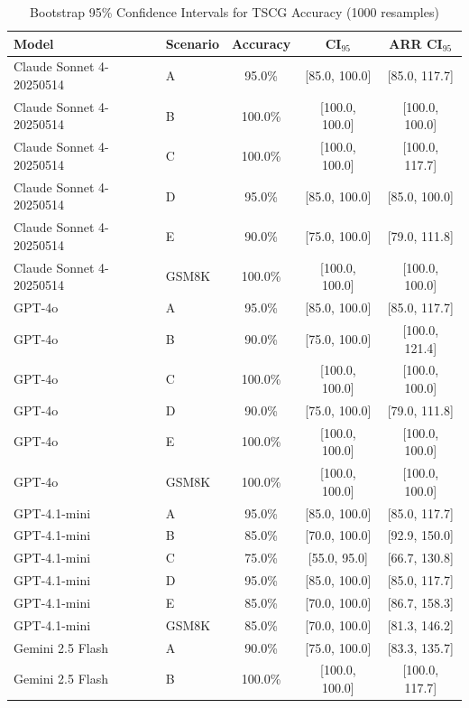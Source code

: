 \begin{table}[htbp]
  \centering
  \caption{Bootstrap 95\% Confidence Intervals for TSCG Accuracy (1000 resamples)}
  \label{tab:bootstrap-ci}
  \begin{tabular}{llccc}
    \toprule
    Model & Scenario & Accuracy & CI$_{95}$ & ARR CI$_{95}$ \\
    \midrule
    Claude Sonnet 4-20250514 & A & 95.0\% & [85.0, 100.0] & [85.0, 117.7] \\
    Claude Sonnet 4-20250514 & B & 100.0\% & [100.0, 100.0] & [100.0, 100.0] \\
    Claude Sonnet 4-20250514 & C & 100.0\% & [100.0, 100.0] & [100.0, 117.7] \\
    Claude Sonnet 4-20250514 & D & 95.0\% & [85.0, 100.0] & [85.0, 100.0] \\
    Claude Sonnet 4-20250514 & E & 90.0\% & [75.0, 100.0] & [79.0, 111.8] \\
    Claude Sonnet 4-20250514 & GSM8K & 100.0\% & [100.0, 100.0] & [100.0, 100.0] \\
    \addlinespace
    GPT-4o & A & 95.0\% & [85.0, 100.0] & [85.0, 117.7] \\
    GPT-4o & B & 90.0\% & [75.0, 100.0] & [100.0, 121.4] \\
    GPT-4o & C & 100.0\% & [100.0, 100.0] & [100.0, 100.0] \\
    GPT-4o & D & 90.0\% & [75.0, 100.0] & [79.0, 111.8] \\
    GPT-4o & E & 100.0\% & [100.0, 100.0] & [100.0, 100.0] \\
    GPT-4o & GSM8K & 100.0\% & [100.0, 100.0] & [100.0, 100.0] \\
    \addlinespace
    GPT-4.1-mini & A & 95.0\% & [85.0, 100.0] & [85.0, 117.7] \\
    GPT-4.1-mini & B & 85.0\% & [70.0, 100.0] & [92.9, 150.0] \\
    GPT-4.1-mini & C & 75.0\% & [55.0, 95.0] & [66.7, 130.8] \\
    GPT-4.1-mini & D & 95.0\% & [85.0, 100.0] & [85.0, 117.7] \\
    GPT-4.1-mini & E & 85.0\% & [70.0, 100.0] & [86.7, 158.3] \\
    GPT-4.1-mini & GSM8K & 85.0\% & [70.0, 100.0] & [81.3, 146.2] \\
    \addlinespace
    Gemini 2.5 Flash & A & 90.0\% & [75.0, 100.0] & [83.3, 135.7] \\
    Gemini 2.5 Flash & B & 100.0\% & [100.0, 100.0] & [100.0, 117.7] \\

\end{tabular}
\end{table}
